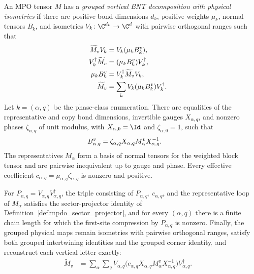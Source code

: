 \begin{definition}
    \label{def:vertical_bnt_grouping_with_isometry}
    \leanok
    An MPO tensor $M$ has a \emph{grouped vertical BNT decomposition with
        physical isometries} if there are positive bond dimensions $d_k$, positive
    weights $\mu_k$, normal tensors $B_k$, and isometries
    $V_k\colon\C^{d_k}\to\C^d$ with pairwise orthogonal ranges such that
    \begin{align}
        \widetilde M_vV_k         & =V_k(\mu_kB_k^v),
        \notag                                                         \\
        V_k^\dagger\widetilde M_v & =(\mu_kB_k^v)V_k^\dagger,
        \notag                                                         \\
        \mu_kB_k^v                & =V_k^\dagger\widetilde M_vV_k,
        \notag                                                         \\
        \widetilde M_v            & =\sum_kV_k(\mu_kB_k^v)V_k^\dagger.
        \notag
    \end{align}
    Let $k=(\alpha,q)$ be the phase-class enumeration. There are equalities of
    the representative and copy bond dimensions, invertible gauges
    $X_{\alpha,q}$, and nonzero phases $\zeta_{\alpha,q}$ of unit modulus,
    with $X_{\alpha,0}=\Id$ and $\zeta_{\alpha,0}=1$, such that
    \begin{align}
        B_{\alpha,q}^v
         & =\zeta_{\alpha,q}X_{\alpha,q}M_\alpha^vX_{\alpha,q}^{-1}.
        \notag
    \end{align}
    The representatives $M_\alpha$ form a basis of normal tensors for the
    weighted block tensor and are pairwise inequivalent up to gauge and phase.
    Every effective coefficient
    $c_{\alpha,q}=\mu_{\alpha,q}\zeta_{\alpha,q}$ is nonzero and positive.

    For
    $P_{\alpha,q}=V_{\alpha,q}V_{\alpha,q}^\dagger$, the triple consisting of
    $P_{\alpha,q}$, $c_{\alpha,q}$, and the representative loop of $M_\alpha$
    satisfies the sector-projector identity of
    Definition~\ref{def:mpdo_sector_projector}, and for every
    $(\alpha,q)$ there is a finite chain length for which the first-site
    compression by $P_{\alpha,q}$ is nonzero.
    Finally, the grouped physical maps remain isometries with pairwise
    orthogonal ranges, satisfy both grouped intertwining identities and the
    grouped corner identity, and reconstruct each vertical letter exactly:
    \begin{align}
        \widetilde M_v
         & =\sum_\alpha\sum_q
        V_{\alpha,q}
        \bigl(c_{\alpha,q}X_{\alpha,q}M_\alpha^v
        X_{\alpha,q}^{-1}\bigr)V_{\alpha,q}^\dagger.
        \label{eq:vertical_bnt_grouping_with_isometry}
    \end{align}
\end{definition}


